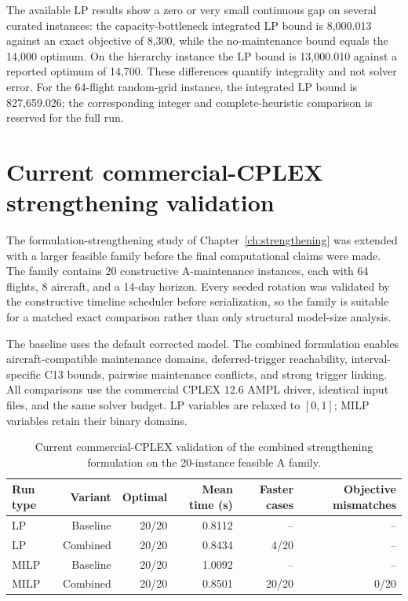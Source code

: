 The available LP results show a zero or very small continuous gap on several
curated instances: the capacity-bottleneck integrated LP bound is 8,000.013
against an exact objective of 8,300, while the no-maintenance bound equals the
14,000 optimum. On the hierarchy instance the LP bound is 13,000.010 against a
reported optimum of 14,700. These differences quantify integrality and not
solver error. For the 64-flight random-grid instance, the integrated LP bound
is 827,659.026; the corresponding integer and complete-heuristic comparison is
reserved for the full run.

\section{Current commercial-CPLEX strengthening validation}
\label{sec:computational_current_strengthening}

The formulation-strengthening study of Chapter~\ref{ch:strengthening} was
extended with a larger feasible family before the final computational claims
were made. The family contains 20 constructive A-maintenance instances, each
with 64 flights, 8 aircraft, and a 14-day horizon. Every seeded rotation was
validated by the constructive timeline scheduler before serialization, so the
family is suitable for a matched exact comparison rather than only structural
model-size analysis.

The baseline uses the default corrected model. The combined formulation enables
aircraft-compatible maintenance domains, deferred-trigger reachability,
interval-specific C13 bounds, pairwise maintenance conflicts, and strong
trigger linking. All comparisons use the commercial CPLEX 12.6 AMPL driver,
identical input files, and the same solver budget. LP variables are relaxed to
$[0,1]$; MILP variables retain their binary domains.

\begin{table}[t]
\centering\small
\caption{Current commercial-CPLEX validation of the combined strengthening
formulation on the 20-instance feasible A family.}
\label{tab:current_strengthening_cplex}
\begin{tabular}{lrrrrr}
\toprule
Run type & Variant & Optimal & Mean time (s) & Faster cases & Objective mismatches \\
\midrule
LP & Baseline & 20/20 & 0.8112 & -- & -- \\
LP & Combined & 20/20 & 0.8434 & 4/20 & -- \\
MILP & Baseline & 20/20 & 1.0092 & -- & -- \\
MILP & Combined & 20/20 & 0.8501 & 20/20 & 0/20 \\
\bottomrule
\end{tabular}
\end{table}

